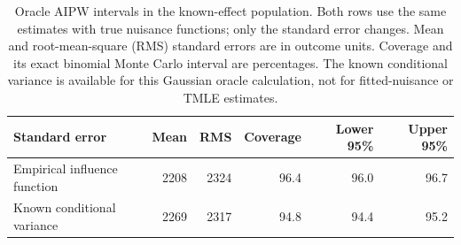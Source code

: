 \begin{table}[ht]
\centering
\small
\caption{Oracle AIPW intervals in the known-effect population.
Both rows use the same estimates with true nuisance functions; only the
standard error changes. Mean and root-mean-square (RMS) standard errors
are in outcome units. Coverage and its exact binomial Monte Carlo interval
are percentages. The known conditional variance is available for this
Gaussian oracle calculation, not for fitted-nuisance or TMLE estimates.}
\label{tab:oracle}

\begin{tabular}{lrrrrr}
\toprule
Standard error & Mean & RMS & Coverage & Lower 95\% & Upper 95\%\\
\midrule
Empirical influence function & 2208 & 2324 & 96.4 & 96.0 & 96.7\\
Known conditional variance & 2269 & 2317 & 94.8 & 94.4 & 95.2\\
\bottomrule
\end{tabular}
\end{table}
